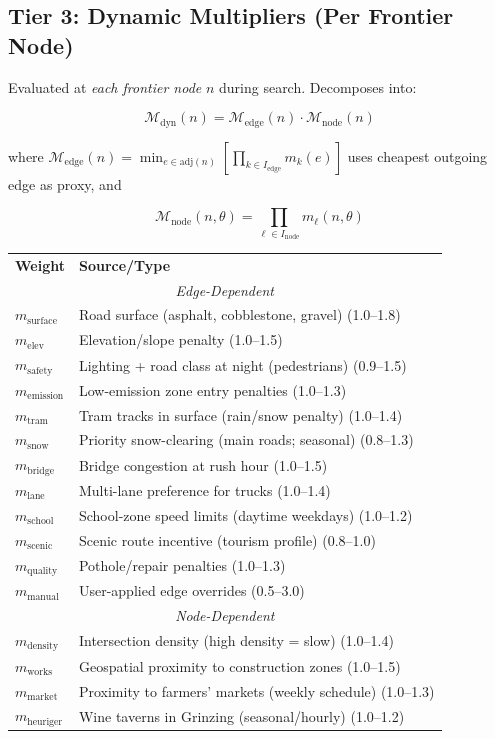 \documentclass[12pt,a4paper]{article}
\newcommand{\M}{\mathcal{M}}
\newcommand{\Adj}{\text{adj}}
\begin{document}
\subsection*{Tier 3: Dynamic Multipliers (Per Frontier Node)}

Evaluated at \textit{each frontier node} $n$ during search. Decomposes into:

\[
\M_{\text{dyn}}(n) = \M_{\text{edge}}(n) \cdot \M_{\text{node}}(n)
\]

where $\M_{\text{edge}}(n) = \min_{e \in \Adj(n)} \left[\prod_{k \in I_{\text{edge}}} m_k(e)\right]$ uses cheapest outgoing edge as proxy, and

\[
\M_{\text{node}}(n, \theta) = \prod_{\ell \in I_{\text{node}}} m_\ell(n, \theta)
\]

\begin{center}
\begin{tabular}{ll}
\textbf{Weight} & \textbf{Source/Type} \\
\multicolumn{2}{c}{\textit{Edge-Dependent}} \\
$m_{\text{surface}}$ & Road surface (asphalt, cobblestone, gravel) (1.0–1.8) \\
$m_{\text{elev}}$ & Elevation/slope penalty (1.0–1.5) \\
$m_{\text{safety}}$ & Lighting + road class at night (pedestrians) (0.9–1.5) \\
$m_{\text{emission}}$ & Low-emission zone entry penalties (1.0–1.3) \\
$m_{\text{tram}}$ & Tram tracks in surface (rain/snow penalty) (1.0–1.4) \\
$m_{\text{snow}}$ & Priority snow-clearing (main roads; seasonal) (0.8–1.3) \\
$m_{\text{bridge}}$ & Bridge congestion at rush hour (1.0–1.5) \\
$m_{\text{lane}}$ & Multi-lane preference for trucks (1.0–1.4) \\
$m_{\text{school}}$ & School-zone speed limits (daytime weekdays) (1.0–1.2) \\
$m_{\text{scenic}}$ & Scenic route incentive (tourism profile) (0.8–1.0) \\
$m_{\text{quality}}$ & Pothole/repair penalties (1.0–1.3) \\
$m_{\text{manual}}$ & User-applied edge overrides (0.5–3.0) \\
\multicolumn{2}{c}{\textit{Node-Dependent}} \\
$m_{\text{density}}$ & Intersection density (high density = slow) (1.0–1.4) \\
$m_{\text{works}}$ & Geospatial proximity to construction zones (1.0–1.5) \\
$m_{\text{market}}$ & Proximity to farmers' markets (weekly schedule) (1.0–1.3) \\
$m_{\text{heuriger}}$ & Wine taverns in Grinzing (seasonal/hourly) (1.0–1.2) \\
\end{tabular}
\end{center}
\end{document}
